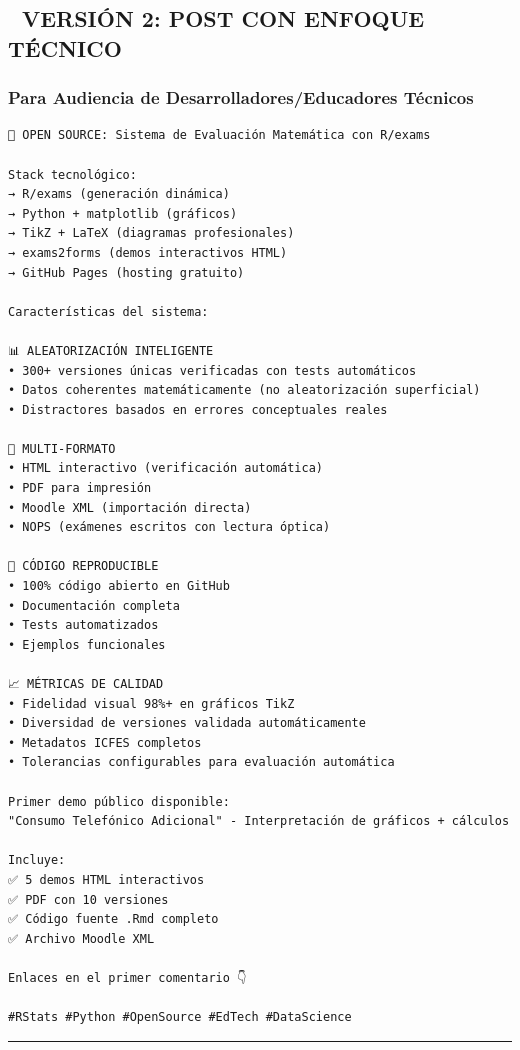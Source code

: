 \documentclass[
]{article}
\begin{document}
\subsection{🎨 VERSIÓN 2: POST CON ENFOQUE
TÉCNICO}\label{versiuxf3n-2-post-con-enfoque-tuxe9cnico}

\subsubsection{Para Audiencia de Desarrolladores/Educadores
Técnicos}\label{para-audiencia-de-desarrolladoreseducadores-tuxe9cnicos}

\begin{verbatim}
🚀 OPEN SOURCE: Sistema de Evaluación Matemática con R/exams

Stack tecnológico:
→ R/exams (generación dinámica)
→ Python + matplotlib (gráficos)
→ TikZ + LaTeX (diagramas profesionales)
→ exams2forms (demos interactivos HTML)
→ GitHub Pages (hosting gratuito)

Características del sistema:

📊 ALEATORIZACIÓN INTELIGENTE
• 300+ versiones únicas verificadas con tests automáticos
• Datos coherentes matemáticamente (no aleatorización superficial)
• Distractores basados en errores conceptuales reales

🎯 MULTI-FORMATO
• HTML interactivo (verificación automática)
• PDF para impresión
• Moodle XML (importación directa)
• NOPS (exámenes escritos con lectura óptica)

🔧 CÓDIGO REPRODUCIBLE
• 100% código abierto en GitHub
• Documentación completa
• Tests automatizados
• Ejemplos funcionales

📈 MÉTRICAS DE CALIDAD
• Fidelidad visual 98%+ en gráficos TikZ
• Diversidad de versiones validada automáticamente
• Metadatos ICFES completos
• Tolerancias configurables para evaluación automática

Primer demo público disponible:
"Consumo Telefónico Adicional" - Interpretación de gráficos + cálculos

Incluye:
✅ 5 demos HTML interactivos
✅ PDF con 10 versiones
✅ Código fuente .Rmd completo
✅ Archivo Moodle XML

Enlaces en el primer comentario 👇

#RStats #Python #OpenSource #EdTech #DataScience
\end{verbatim}

\begin{center}\rule{0.5\linewidth}{0.5pt}\end{center}
\end{document}
